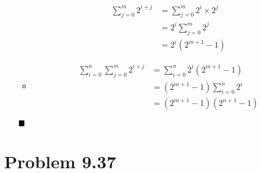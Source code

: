 \documentclass{article}
\def\math#1{$#1$}
\begin{document}
\begin{itemize}
\begin{itemize}
\begin{equation}
\begin{split}
                   \sum_{j=0}^m 2^{i+j} &=\sum_{j=0}^m 2^i \times 2^j \\
                   &= 2^i \sum_{j=0}^m 2^j \\
                   &= 2^i(2^{m+1} - 1)
                \end{split}
            \end{equation}
            \item \begin{equation}
                    \begin{split}
                      \sum_{i=0}^n \sum_{j=0}^m 2^{i+j} &= \sum_{i=0}^n 2^i(2^{m+1} - 1) \\
                       &= (2^{m+1} - 1) \sum_{i=0}^n 2^i \\
                       &= (2^{m+1} - 1)(2^{n+1} - 1)
                    \end{split}
                \end{equation}
        \end{itemize}
        \math{\hfill{\blacksquare}}
\end{itemize}

\section{Problem 9.37}
\end{document}
